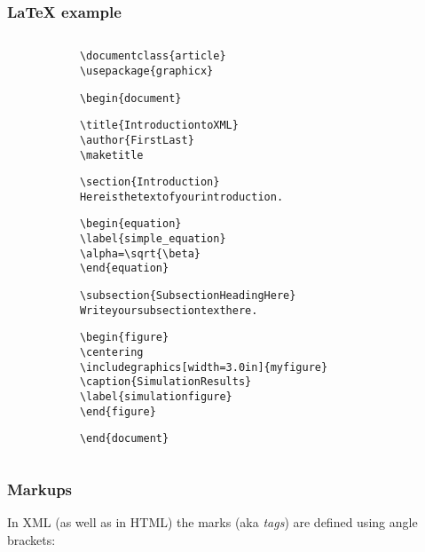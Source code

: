 \documentclass[12pt]{beamer}\usepackage[]{graphicx}\usepackage[]{color}
\makeatletter
\newenvironment{kframe}{%
 \def\at@end@of@kframe{}%
 \ifinner\ifhmode%
  \def\at@end@of@kframe{\end{minipage}}%
  \begin{minipage}{\columnwidth}%
 \fi\fi%
 \def\FrameCommand##1{\hskip\@totalleftmargin \hskip-\fboxsep
 \colorbox{shadecolor}{##1}\hskip-\fboxsep
     \hskip-\linewidth \hskip-\@totalleftmargin \hskip\columnwidth}%
 \MakeFramed {\advance\hsize-\width
   \@totalleftmargin\z@ \linewidth\hsize
   \@setminipage}}%
 {\par\unskip\endMakeFramed%
 \at@end@of@kframe}
\newenvironment{knitrout}{}{} %
\makeatother
\begin{document}

\begin{frame}[fragile]
\frametitle{LaTeX example}

\begin{columns}[t]
\begin{column}{0.1\textwidth}
\end{column}
\begin{column}{0.6\textwidth}
\begin{knitrout}\tiny
{}\color{fgcolor}\begin{kframe}
\begin{alltt}
\textbackslash{}documentclass\{article\}
\textbackslash{}usepackage\{graphicx\}

\textbackslash{}begin\{document\}

\textbackslash{}title\{Introduction to XML\}
\textbackslash{}author\{First Last\}
\textbackslash{}maketitle

\textbackslash{}section\{Introduction\}
Here is the text of your introduction.

\textbackslash{}begin\{equation\}
    \textbackslash{}label\{simple_equation\}
    \textbackslash{}alpha = \textbackslash{}sqrt\{ \textbackslash{}beta \}
\textbackslash{}end\{equation\}

\textbackslash{}subsection\{Subsection Heading Here\}
Write your subsection text here.

\textbackslash{}begin\{figure\}
    \textbackslash{}centering
    \textbackslash{}includegraphics[width=3.0in]\{myfigure\}
    \textbackslash{}caption\{Simulation Results\}
    \textbackslash{}label\{simulationfigure\}
\textbackslash{}end\{figure\}

\textbackslash{}end\{document\}
\end{alltt}
\end{kframe}
\end{knitrout}
\end{column}

\begin{column}{0.1\textwidth}
\end{column}

\end{columns}

\end{frame}


\begin{frame}[fragile]
\frametitle{Markups}

In XML (as well as in HTML) the marks (aka \textit{tags}) are defined using angle brackets: {\Large {\hilit \code{<>}}}
\eb

\bigskip


\end{frame}
\end{document}
